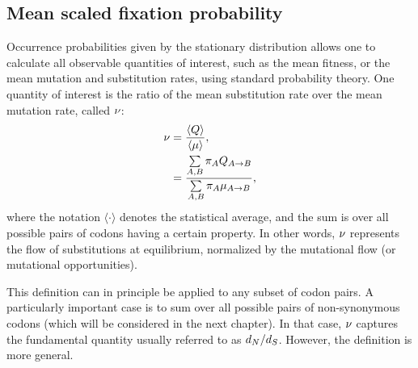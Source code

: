 \subsection{Mean scaled fixation probability}
\label{subsec:mean-scaled-fixation-probability}

Occurrence probabilities given by the stationary distribution allows one to calculate all observable quantities of interest, such as the mean fitness, or the mean mutation and substitution rates, using standard probability theory.
One quantity of interest is the ratio of the mean substitution rate over the mean mutation rate, called $ \nu $:
\begin{align}
    \nu & = \dfrac{ \langle Q \rangle }{\langle \mu \rangle},
    \label{eq:relative-sub-rate} \\
    & = \dfrac{ \sum\limits_{A, B} \pi_{A} Q_{A \to B}}{\sum\limits_{A, B} \pi_{A} \mu_{A \to B}},
\end{align}
where the notation $\langle \cdot \rangle$ denotes the statistical average, and the sum is over all possible pairs of codons having a certain property.
In other words, $\nu$ represents the flow of substitutions at equilibrium, normalized by the mutational flow (or mutational opportunities).

This definition can in principle be applied to any subset of codon pairs.
A particularly important case is to sum over all possible pairs of non-synonymous codons (which will be considered in the next chapter).
In that case, $\nu$ captures the fundamental quantity usually referred to as $d_N / d_S$.
However, the definition is more general.

